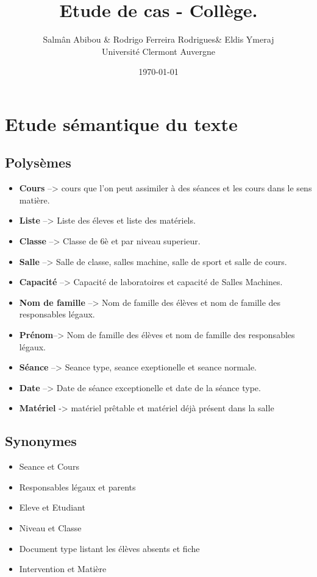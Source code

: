 \documentclass[12pt,french,titlepage]{article}
\title{Etude de cas - Collège.}
\author{Salmân Abibou \& Rodrigo Ferreira Rodrigues\& Eldis Ymeraj \\ \hline
Université Clermont Auvergne\\ \hline}
\date{\today}
\begin{document}
	\maketitle


	\tableofcontents
	\newpage
	
	\section{Etude sémantique du texte}
	
	\subsection{Polysèmes}
	
	\begin{itemize}
	    \item \textbf{Cours}          --> cours que l'on peut assimiler à des séances et les cours dans le sens matière.
	    \item  \textbf{Liste}          --> Liste des éleves et liste des matériels.
	    \item \textbf{Classe}  --> Classe de 6è et par niveau superieur.
	    \item \textbf{Salle} --> Salle de classe, salles machine, salle de sport et salle de cours.
	    \item \textbf{Capacité} --> Capacité de laboratoires et capacité de Salles Machines.
	    \item \textbf{Nom de famille} --> Nom de famille des élèves et nom de famille des responsables légaux.	
	    \item \textbf{Prénom}--> Nom de famille des élèves et nom de famille des responsables légaux.
	    \item \textbf{Séance} --> Seance type, seance exeptionelle et seance normale.
	    \item \textbf{Date} --> Date de séance exceptionelle et date de la séance type.
	    \item \textbf{Matériel} -> matériel prêtable et matériel déjà présent dans la salle
	  \end{itemize}
	  
	  \subsection{Synonymes}
	  
	  \begin{itemize}
	      \item Seance et Cours
	      \item Responsables légaux et parents
	      \item Eleve et Etudiant
	      \item Niveau et Classe
	      \item Document type listant les élèves absents  et fiche
	      \item Intervention et Matière
	  \end{itemize}
	  
\end{document}
